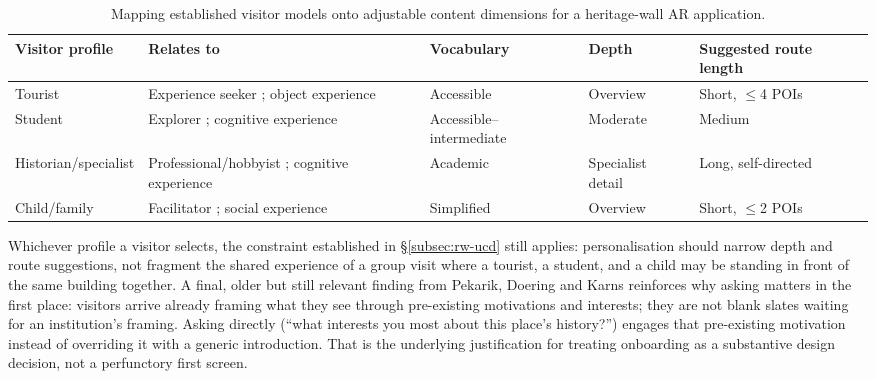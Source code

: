 \begin{table}[h]
\centering
\caption{Mapping established visitor models onto adjustable content dimensions for
a heritage-wall AR application.}
\label{tab:profile-mapping}
\small
\begin{tabular}{p{2.5cm}p{3.2cm}p{2.6cm}p{2.6cm}p{2.6cm}}
\toprule
\textbf{Visitor profile} & \textbf{Relates to} & \textbf{Vocabulary} & \textbf{Depth} & \textbf{Suggested route length} \\
\midrule
Tourist & Experience seeker \cite{falk2009}; object experience \cite{pekarik1999} & Accessible & Overview & Short, $\leq$4 POIs \\
Student & Explorer \cite{falk2009}; cognitive experience \cite{pekarik1999} & Accessible--intermediate & Moderate & Medium \\
Historian/specialist & Professional/hobbyist \cite{falk2009}; cognitive experience \cite{pekarik1999} & Academic & Specialist detail & Long, self-directed \\
Child/family & Facilitator \cite{falk2009}; social experience \cite{pekarik1999} & Simplified & Overview & Short, $\leq$2 POIs \\
\bottomrule
\end{tabular}
\end{table}

Whichever profile a visitor selects, the constraint established in
\S\ref{subsec:rw-ucd} still applies: personalisation should narrow depth and route
suggestions, not fragment the shared experience of a group visit where a tourist,
a student, and a child may be standing in front of the same building together. A
final, older but still relevant finding from Pekarik, Doering and Karns
\cite{pekarik1999} reinforces why asking matters in the first place: visitors
arrive already framing what they see through pre-existing motivations and interests;
they are not blank slates waiting for an institution's framing. Asking directly
(``what interests you most about this place's history?'') engages that
pre-existing motivation instead of overriding it with a generic introduction. That
is the underlying justification for treating onboarding as a substantive design
decision, not a perfunctory first screen.

















